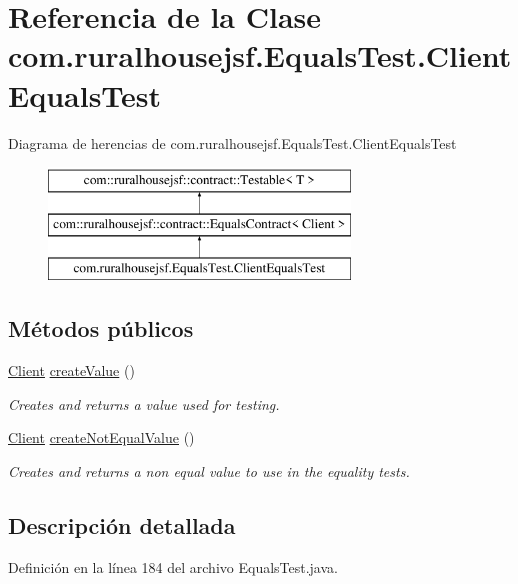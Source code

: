 \hypertarget{a00252}{}\section{Referencia de la Clase com.\+ruralhousejsf.\+Equals\+Test.\+Client\+Equals\+Test}
\label{a00252}
Diagrama de herencias de com.\+ruralhousejsf.\+Equals\+Test.\+Client\+Equals\+Test\begin{figure}[H]
\begin{center}
\leavevmode
\includegraphics[height=3.000000cm]{a00252}
\end{center}
\end{figure}
\subsection*{Métodos públicos}
\begin{DoxyCompactItemize}
\item 
\mbox{\hyperlink{a00164}{Client}} \mbox{\hyperlink{a00252_aa74f54ea042862db1a5499d31ec75539}{create\+Value}} ()
\begin{DoxyCompactList}\small\item\em Creates and returns a value used for testing. \end{DoxyCompactList}\item 
\mbox{\hyperlink{a00164}{Client}} \mbox{\hyperlink{a00252_a25218bb97f8e3d88b9dd7e13afd0a6ed}{create\+Not\+Equal\+Value}} ()
\begin{DoxyCompactList}\small\item\em Creates and returns a non equal value to use in the equality tests. \end{DoxyCompactList}\end{DoxyCompactItemize}


\subsection{Descripción detallada}


Definición en la línea 184 del archivo Equals\+Test.\+java.



